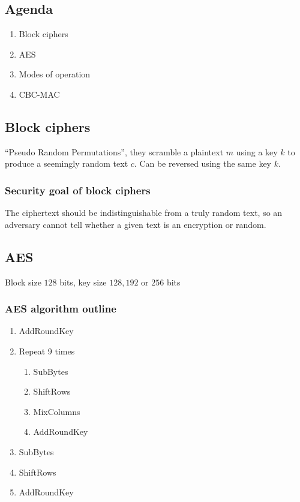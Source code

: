 

\subsection*{Agenda}
\begin{enumerate}
\item Block ciphers
\item AES
\item Modes of operation
\item CBC-MAC
\end{enumerate}

\subsection{Block ciphers}

``Pseudo Random Permutations'', they scramble a plaintext $m$ using a
key $k$ to produce a seemingly random text $c$. Can be reversed using
the same key $k$.

\subsubsection*{Security goal of block ciphers}

The ciphertext should be indistinguishable from a truly random text,
so an adversary cannot tell whether a given text is an encryption or
random.

\subsection{AES}
Block size $128$ bits, key size $128, 192$ or $256$ bits

\subsubsection*{AES algorithm outline}

\begin{enumerate}
\item AddRoundKey
\item Repeat 9 times
  \begin{enumerate}
  \item SubBytes
  \item ShiftRows
  \item MixColumns
  \item AddRoundKey
  \end{enumerate}
\item SubBytes
\item ShiftRows
\item AddRoundKey
\end{enumerate}

